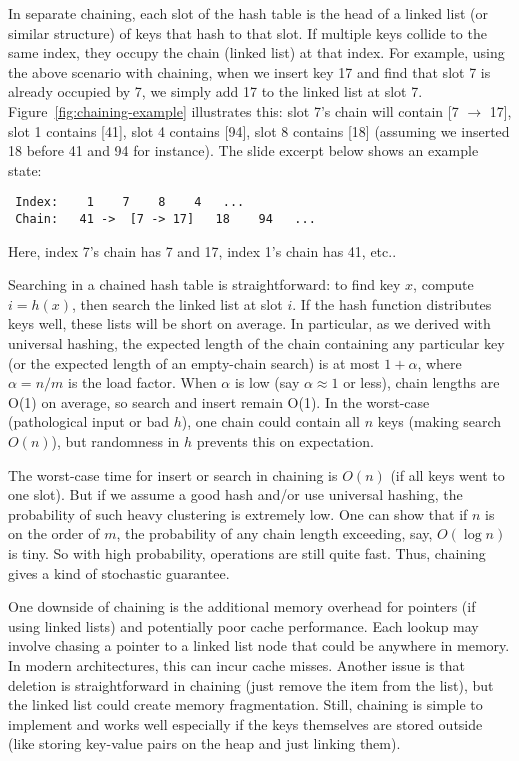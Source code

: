 \documentclass[11pt]{article}
\begin{document}
In separate chaining, each slot of the hash table is the head of a linked list (or similar structure) of keys that hash to that slot. If multiple keys collide to the same index, they occupy the chain (linked list) at that index. For example, using the above scenario with chaining, when we insert key 17 and find that slot 7 is already occupied by 7, we simply add 17 to the linked list at slot 7. Figure~\ref{fig:chaining-example} illustrates this: slot 7’s chain will contain [7 $\to$ 17], slot 1 contains [41], slot 4 contains [94], slot 8 contains [18] (assuming we inserted 18 before 41 and 94 for instance). The slide excerpt below shows an example state:
\begin{verbatim}
 Index:    1    7    8    4   ... 
 Chain:   41 ->  [7 -> 17]   18    94   ...
\end{verbatim}
Here, index 7’s chain has 7 and 17, index 1’s chain has 41, etc..

Searching in a chained hash table is straightforward: to find key $x$, compute $i = h(x)$, then search the linked list at slot $i$. If the hash function distributes keys well, these lists will be short on average. In particular, as we derived with universal hashing, the expected length of the chain containing any particular key (or the expected length of an empty-chain search) is at most $1 + \alpha$, where $\alpha = n/m$ is the load factor. When $\alpha$ is low (say $\alpha \approx 1$ or less), chain lengths are O(1) on average, so search and insert remain O(1). In the worst-case (pathological input or bad $h$), one chain could contain all $n$ keys (making search $O(n)$), but randomness in $h$ prevents this on expectation.

The worst-case time for insert or search in chaining is $O(n)$ (if all keys went to one slot). But if we assume a good hash and/or use universal hashing, the probability of such heavy clustering is extremely low. One can show that if $n$ is on the order of $m$, the probability of any chain length exceeding, say, $O(\log n)$ is tiny. So with high probability, operations are still quite fast. Thus, chaining gives a kind of stochastic guarantee.

One downside of chaining is the additional memory overhead for pointers (if using linked lists) and potentially poor cache performance. Each lookup may involve chasing a pointer to a linked list node that could be anywhere in memory. In modern architectures, this can incur cache misses. Another issue is that deletion is straightforward in chaining (just remove the item from the list), but the linked list could create memory fragmentation. Still, chaining is simple to implement and works well especially if the keys themselves are stored outside (like storing key-value pairs on the heap and just linking them).
\end{document}
